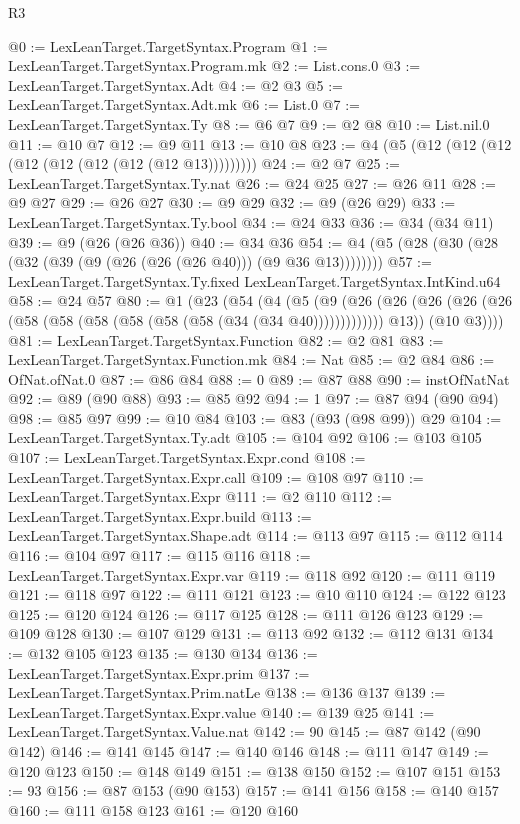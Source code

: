 \begin{lexlean}{R3}
\begin{coremodule}
@0 := LexLeanTarget.TargetSyntax.Program
@1 := LexLeanTarget.TargetSyntax.Program.mk
@2 := List.cons.{0}
@3 := LexLeanTarget.TargetSyntax.Adt
@4 := @2 @3
@5 := LexLeanTarget.TargetSyntax.Adt.mk
@6 := List.{0}
@7 := LexLeanTarget.TargetSyntax.Ty
@8 := @6 @7
@9 := @2 @8
@10 := List.nil.{0}
@11 := @10 @7
@12 := @9 @11
@13 := @10 @8
@23 := @4 (@5 (@12 (@12 (@12 (@12 (@12 (@12 (@12 (@12 @13)))))))))
@24 := @2 @7
@25 := LexLeanTarget.TargetSyntax.Ty.nat
@26 := @24 @25
@27 := @26 @11
@28 := @9 @27
@29 := @26 @27
@30 := @9 @29
@32 := @9 (@26 @29)
@33 := LexLeanTarget.TargetSyntax.Ty.bool
@34 := @24 @33
@36 := @34 (@34 @11)
@39 := @9 (@26 (@26 @36))
@40 := @34 @36
@54 := @4 (@5 (@28 (@30 (@28 (@32 (@39 (@9 (@26 (@26 (@26 @40))) (@9 @36 @13))))))))
@57 := LexLeanTarget.TargetSyntax.Ty.fixed LexLeanTarget.TargetSyntax.IntKind.u64
@58 := @24 @57
@80 := @1
    (@23
      (@54
        (@4
          (@5
            (@9
              (@26 (@26 (@26 (@26 (@26 (@58 (@58 (@58 (@58 (@58 (@58 (@34 (@34 @40)))))))))))))
              @13))
          (@10 @3))))
@81 := LexLeanTarget.TargetSyntax.Function
@82 := @2 @81
@83 := LexLeanTarget.TargetSyntax.Function.mk
@84 := Nat
@85 := @2 @84
@86 := OfNat.ofNat.{0}
@87 := @86 @84
@88 := 0
@89 := @87 @88
@90 := instOfNatNat
@92 := @89 (@90 @88)
@93 := @85 @92
@94 := 1
@97 := @87 @94 (@90 @94)
@98 := @85 @97
@99 := @10 @84
@103 := @83 (@93 (@98 @99)) @29
@104 := LexLeanTarget.TargetSyntax.Ty.adt
@105 := @104 @92
@106 := @103 @105
@107 := LexLeanTarget.TargetSyntax.Expr.cond
@108 := LexLeanTarget.TargetSyntax.Expr.call
@109 := @108 @97
@110 := LexLeanTarget.TargetSyntax.Expr
@111 := @2 @110
@112 := LexLeanTarget.TargetSyntax.Expr.build
@113 := LexLeanTarget.TargetSyntax.Shape.adt
@114 := @113 @97
@115 := @112 @114
@116 := @104 @97
@117 := @115 @116
@118 := LexLeanTarget.TargetSyntax.Expr.var
@119 := @118 @92
@120 := @111 @119
@121 := @118 @97
@122 := @111 @121
@123 := @10 @110
@124 := @122 @123
@125 := @120 @124
@126 := @117 @125
@128 := @111 @126 @123
@129 := @109 @128
@130 := @107 @129
@131 := @113 @92
@132 := @112 @131
@134 := @132 @105 @123
@135 := @130 @134
@136 := LexLeanTarget.TargetSyntax.Expr.prim
@137 := LexLeanTarget.TargetSyntax.Prim.natLe
@138 := @136 @137
@139 := LexLeanTarget.TargetSyntax.Expr.value
@140 := @139 @25
@141 := LexLeanTarget.TargetSyntax.Value.nat
@142 := 90
@145 := @87 @142 (@90 @142)
@146 := @141 @145
@147 := @140 @146
@148 := @111 @147
@149 := @120 @123
@150 := @148 @149
@151 := @138 @150
@152 := @107 @151
@153 := 93
@156 := @87 @153 (@90 @153)
@157 := @141 @156
@158 := @140 @157
@160 := @111 @158 @123
@161 := @120 @160

\end{coremodule}
\end{lexlean}

